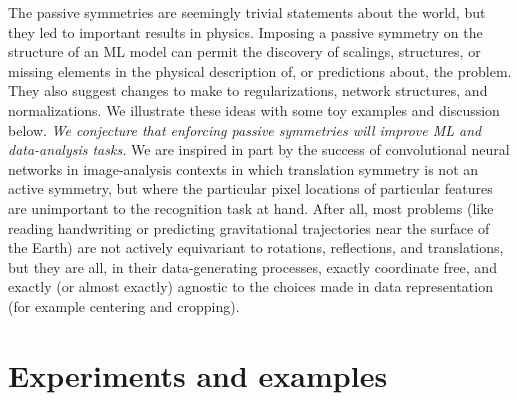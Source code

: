 \documentclass[preprint]{article} %
\begin{document}
The passive symmetries are seemingly trivial statements about the world, but they led to important results in physics.
Imposing a passive symmetry on the structure of an ML model can permit the discovery of scalings, structures, or missing elements in the physical description of, or predictions about, the problem.
They also suggest changes to make to regularizations, network structures, and normalizations.
We illustrate these ideas with some toy examples and discussion below.
\emph{We conjecture that enforcing passive symmetries will improve ML and data-analysis tasks.}
We are inspired in part by the success of convolutional neural networks in image-analysis contexts in which translation symmetry is not an active symmetry, but where the particular pixel locations of particular features are unimportant to the recognition task at hand.
After all, most problems (like reading handwriting or predicting gravitational trajectories near the surface of the Earth) are not actively equivariant to rotations, reflections, and translations, but they are all, in their data-generating processes, exactly coordinate free, and exactly (or almost exactly) agnostic to the choices made in data representation (for example centering and cropping).

\section{Experiments and examples}\label{sec:experiments}
\end{document}
